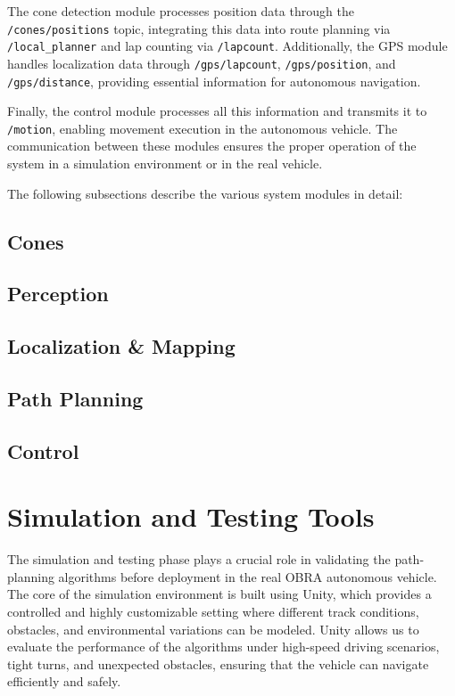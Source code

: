 \documentclass[a4paper,11pt]{report}
\begin{document}
The cone detection module processes position data through the \texttt{/cones/positions} topic, integrating this data into route planning via \texttt{/local\_planner} and lap counting via \texttt{/lapcount}. Additionally, the GPS module handles localization data through \texttt{/gps/lapcount}, \texttt{/gps/position}, and \texttt{/gps/distance}, providing essential information for autonomous navigation.

Finally, the control module processes all this information and transmits it to \texttt{/motion}, enabling movement execution in the autonomous vehicle. The communication between these modules ensures the proper operation of the system in a simulation environment or in the real vehicle.

The following subsections describe the various system modules in detail:

\subsection{Cones}

\subsection{Perception}

\subsection{Localization \& Mapping}

\subsection{Path Planning}

\subsection{Control}




\section{Simulation and Testing Tools}

The simulation and testing phase plays a crucial role in validating the path-planning algorithms before deployment in the real OBRA autonomous vehicle. The core of the simulation environment is built using Unity, which provides a controlled and highly customizable setting where different track conditions, obstacles, and environmental variations can be modeled. Unity allows us to evaluate the performance of the algorithms under high-speed driving scenarios, tight turns, and unexpected obstacles, ensuring that the vehicle can navigate efficiently and safely.
\end{document}
